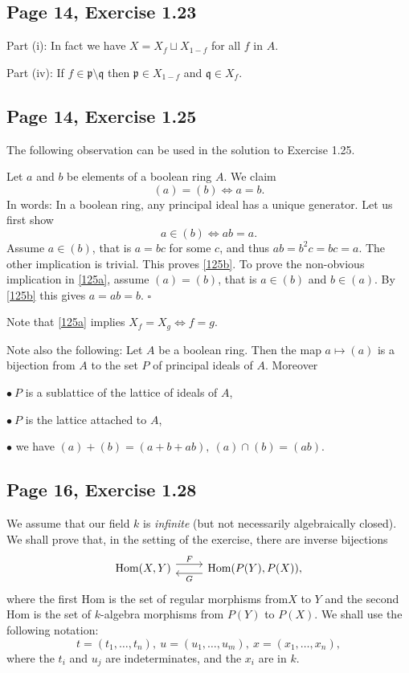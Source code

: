 \documentclass[parskip=half,fontsize=12pt]{scrartcl}%
\newcommand{\mf}{\mathfrak}
\newcommand{\ppp}{\mf p}
\begin{document}
\subsection{Page 14, Exercise 1.23}%

Part (i): In fact we have $X=X_f\sqcup X_{1-f}$ for all $f$ in $A$.

Part (iv): If $f\in\ppp\setminus\mf q$ then $\ppp\in X_{1-f}$ and $\mf q\in X_f$.

\subsection{Page 14, Exercise 1.25}%

The following observation can be used in the solution to Exercise 1.25.

Let $a$ and $b$ be elements of a boolean ring $A$. We claim
\begin{equation}\label{125a}
(a)=(b)\iff a=b.
\end{equation} 
In words: In a boolean ring, any principal ideal has a unique generator. Let us first show 
\begin{equation}\label{125b}
a\in(b)\iff ab=a.
\end{equation}
Assume $a\in(b)$, that is $a=bc$ for some $c$, and thus $ab=b^2c=bc=a$. The other implication is trivial. This proves \eqref{125b}. To prove the non-obvious implication in \eqref{125a}, assume $(a)=(b)$, that is $a\in(b)$ and $b\in(a)$. By \eqref{125b} this gives $a=ab=b$. $\square$

Note that \eqref{125a} implies $X_f=X_g\iff f=g$.

Note also the following: Let $A$ be a boolean ring. Then the map $a\mapsto(a)$ is a bijection from $A$ to the set $P$ of principal ideals of $A$. Moreover 

$\bullet\ P$ is a sublattice of the lattice of ideals of $A$, 

$\bullet\  P$ is the lattice attached to $A$,

$\bullet$ we have $(a)+(b)=(a+b+ab),\ (a)\cap(b)=(ab)$.

\subsection{Page 16, Exercise 1.28}%

We assume that our field $k$ is \emph{infinite} (but not necessarily algebraically closed). We shall prove that, in the setting of the exercise, there are inverse bijections 
$$
\begin{tikzcd}
\text{Hom}(X,Y)\ar[r,yshift=4pt,"F"]&\text{Hom}(P(Y),P(X))\ar[l,yshift=-4pt,"G"],
\end{tikzcd}
$$ 
where the first $\text{Hom}$ is the set of regular morphisms from$X$ to $Y$ and the second $\text{Hom}$ is the set of $k$-algebra morphisms from $P(Y)$ to $P(X)$. We shall use the following notation:
$$
t=(t_1,\dots,t_n),\ u=(u_1,\dots,u_m),\ x=(x_1,\dots,x_n),%
$$ 
where the $t_i$ and $u_j$ are indeterminates, and the $x_i$ are in $k$.
\end{document}
